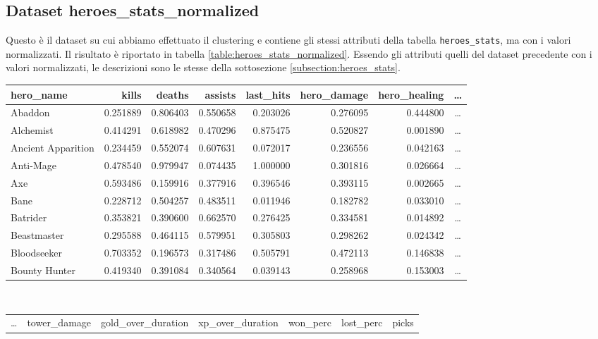 \documentclass[a4paper,12pt,openany,oneside]{book}
\begin{document}
\subsection{Dataset heroes\_stats\_normalized}
Questo è il dataset su cui abbiamo effettuato il clustering e contiene gli stessi attributi della tabella \verb|heroes_stats|, ma con i valori normalizzati. Il risultato è riportato in tabella \ref{table:heroes_stats_normalized}. Essendo gli attributi quelli del dataset precedente con i valori normalizzati, le descrizioni sono le stesse della sottosezione \ref{subsection:heroes_stats}.
\begin{table}[H]
	\scriptsize	
	\centering	
	\begin{tabularx}{0.88\textwidth}{lrrrrrrc}
	    hero\_name &    kills &   deaths &  assists & last\_hits & hero\_damage & hero\_healing & \dots \\
	    \midrule
	    Abaddon & 0.251889 & 0.806403 & 0.550658 &  0.203026 &    0.276095 &            0.444800 & \dots \\
	    Alchemist & 0.414291 & 0.618982 & 0.470296 &  0.875475 &    0.520827 &          0.001890 & \dots \\
	    Ancient Apparition & 0.234459 & 0.552074 & 0.607631 &  0.072017 &    0.236556 & 0.042163 & \dots \\
	    Anti-Mage & 0.478540 & 0.979947 & 0.074435 &  1.000000 &    0.301816 &          0.026664 & \dots \\
	    Axe & 0.593486 & 0.159916 & 0.377916 &  0.396546 &    0.393115 &                0.002665 & \dots \\
	    Bane & 0.228712 & 0.504257 & 0.483511 &  0.011946 &    0.182782 &               0.033010 & \dots \\
	    Batrider & 0.353821 & 0.390600 & 0.662570 &  0.276425 &    0.334581 &           0.014892 & \dots \\
	    Beastmaster & 0.295588 & 0.464115 & 0.579951 &  0.305803 &    0.298262 &        0.024342 & \dots \\
	    Bloodseeker & 0.703352 & 0.196573 & 0.317486 &  0.505791 &    0.472113 &        0.146838 & \dots \\
	    Bounty Hunter & 0.419340 & 0.391084 & 0.340564 &  0.039143 &    0.258968 &      0.153003 & \dots \\
	\end{tabularx}
	\\[3.0em]
	\centering
	\begin{tabularx}{0.83\textwidth}{crrrrrr}
	    \dots & tower\_damage & gold\_over\_duration & xp\_over\_duration & won\_perc & lost\_perc & picks \\

\end{tabularx}
\end{table}
\end{document}
